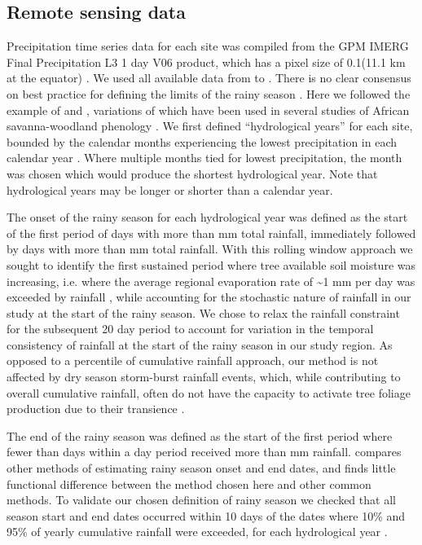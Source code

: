 \documentclass[11pt,a4paper]{article}
\begin{document}
\subsection{Remote sensing data}

Precipitation time series data for each site was compiled from the GPM IMERG
Final Precipitation L3 1 day V06 product, which has a pixel size of
0.1\textdegree (11.1 km at the equator) \citep{IMERG}. We used all available
data from \modisStart{} to \modisEnd{}. There is no clear consensus on best
practice for defining the limits of the rainy season \citep{Guan2014}. Here we
followed the example of \citet{Stern1981} and \citet{Adole2018a}, variations of
which have been used in several studies of African savanna-woodland phenology
\citep{Ryan2017, Tadross2005, Mupangwa2011, Segele2005}. We first defined
``hydrological years'' for each site, bounded by the calendar months
experiencing the lowest precipitation in each calendar year
\citep{Ferijal2022}. Where multiple months tied for lowest precipitation, the
month was chosen which would produce the shortest hydrological year. Note that
hydrological years may be longer or shorter than a calendar year. 

The onset of the rainy season for each hydrological year was defined as the
start of the first period of \onsetPeriodOne{} days with more than
\onsetPrecipOne{} mm total rainfall, immediately followed by \onsetPeriodTwo{}
days with more than \onsetPrecipTwo{} mm total rainfall. With this rolling
window approach we sought to identify the first sustained period where tree
available soil moisture was increasing, i.e. where the average regional
evaporation rate of \textasciitilde{}1 mm per day was exceeded by rainfall
\citep{Campbell1996}, while accounting for the stochastic nature of rainfall in
our study at the start of the rainy season. We chose to relax the rainfall
constraint for the subsequent 20 day period to account for variation in the
temporal consistency of rainfall at the start of the rainy season in our study
region. As opposed to a percentile of cumulative rainfall approach, our method
is not affected by dry season storm-burst rainfall events, which, while
contributing to overall cumulative rainfall, often do not have the capacity to
activate tree foliage production due to their transience \citep{February2016}. 

The end of the rainy season was defined as the start of the first period where
fewer than \numberstringnum{\rainyDaysEnd} days within a \periodEnd{} day
period received more than \rainyDef{} mm rainfall. \citet{Guan2014} compares
other methods of estimating rainy season onset and end dates, and finds little
functional difference between the method chosen here and other common methods.
To validate our chosen definition of rainy season we checked that all season
start and end dates occurred within 10 days of the dates where 10\% and 95\% of
yearly cumulative rainfall were exceeded, for each hydrological year
\citep{Adole2018a}. 
\end{document}
